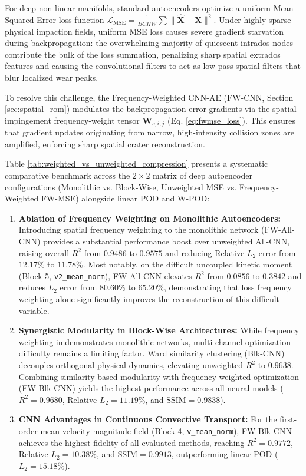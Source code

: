 \documentclass{article}
\begin{document}
For deep non-linear manifolds, standard autoencoders optimize a uniform Mean Squared Error loss function $\mathcal{L}_{\text{MSE}} = \frac{1}{B C H W}\sum \|\hat{\mathbf{X}} - \mathbf{X}\|^2$. Under highly sparse physical impaction fields, uniform MSE loss causes severe gradient starvation during backpropagation: the overwhelming majority of quiescent intrados nodes contribute the bulk of the loss summation, penalizing sharp spatial extrados features and causing the convolutional filters to act as low-pass spatial filters that blur localized wear peaks.

To resolve this challenge, the Frequency-Weighted CNN-AE (FW-CNN, Section \ref{sec:spatial_rom}) modulates the backpropagation error gradients via the spatial impingement frequency-weight tensor $\mathbf{W}_{c,i,j}$ (Eq. \ref{eq:fwmse_loss}). This ensures that gradient updates originating from narrow, high-intensity collision zones are amplified, enforcing sharp spatial crater reconstruction.

Table \ref{tab:weighted_vs_unweighted_compression} presents a systematic comparative benchmark across the $2\times 2$ matrix of deep autoencoder configurations (Monolithic vs. Block-Wise, Unweighted MSE vs. Frequency-Weighted FW-MSE) alongside linear POD and W-POD:
\begin{enumerate}
    \item \textbf{Ablation of Frequency Weighting on Monolithic Autoencoders:} Introducing spatial frequency weighting to the monolithic network (FW-All-CNN) provides a substantial performance boost over unweighted All-CNN, raising overall $R^2$ from $0.9486$ to $0.9575$ and reducing Relative $L_2$ error from $12.17\%$ to $11.78\%$. Most notably, on the difficult uncoupled kinetic moment (Block 5, \texttt{v2\_mean\_norm}), FW-All-CNN elevates $R^2$ from $0.0856$ to $0.3842$ and reduces $L_2$ error from $80.60\%$ to $65.20\%$, demonstrating that loss frequency weighting alone significantly improves the reconstruction of this difficult variable.
    \item \textbf{Synergistic Modularity in Block-Wise Architectures:} While frequency weighting imdemonstrates monolithic networks, multi-channel optimization difficulty remains a limiting factor. Ward similarity clustering (Blk-CNN) decouples orthogonal physical dynamics, elevating unweighted $R^2$ to $0.9638$. Combining similarity-based modularity with frequency-weighted optimization (FW-Blk-CNN) yields the highest performance across all neural models ($R^2 = \mathbf{0.9680}$, Relative $L_2 = \mathbf{11.19\%}$, and $\text{SSIM} = \mathbf{0.9838}$).
    \item \textbf{CNN Advantages in Continuous Convective Transport:} For the first-order mean velocity magnitude field (Block 4, \texttt{v\_mean\_norm}), FW-Blk-CNN achieves the highest fidelity of all evaluated methods, reaching $R^2 = \mathbf{0.9772}$, Relative $L_2 = \mathbf{10.38\%}$, and $\text{SSIM} = \mathbf{0.9913}$, outperforming linear POD ($L_2 = 15.18\%$).
\end{enumerate}
\end{document}
